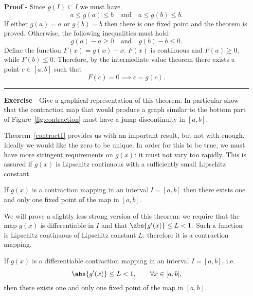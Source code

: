 \noindent
\textbf{Proof} - Since $g(I) \subseteq I$ we must have
%
\begin{equation*}
   a \le g(a) \le b \quad \text{and} \quad a \le g(b) \le b .
\end{equation*}
%
If either $g(a)=a$ or $g(b)=b$ then there is one fixed point and the
theorem is proved.   Otherwise, the following inequalities must hold:
%
\begin{equation*}
  g(a) - a \ge 0 \quad \text{and} \quad g(b) - b \le 0 .
\end{equation*}
%
Define the function $F(x) = g(x) - x$.   $F(x)$ is continuous and
$F(a) \ge 0$, while $F(b) \le 0$.   Therefore, by the intermediate
value theorem there exists a point $c \in [a,b]$ such that
%
\begin{equation*}
  F(c)=0 \implies c = g(c) .
\end{equation*}

\hfill \rule{3mm}{3mm}

\smallskip

\noindent
\textbf{Exercise} - Give a graphical representation of this theorem.
In particular show that the contraction map that would produce a graph
similar to the bottom part of Figure~\ref{fig:contraction} must have a
jump discontinuity in $[a,b]$.

\smallskip

Theorem~\ref{contract1} provides us with an important result, but not
with enough.  Ideally we would like the zero to be unique.  In order
for this to be true, we must have more stringent requirements on
$g(x)$: it must not vary too rapidly.  This is assured if $g(x)$ is
Lipschitz continuous with a sufficiently small Lipschitz constant.

\begin{theorem}
\label{contract2}
If $g(x)$ is a contraction mapping in an interval
$I=[a,b]$ then there exists one and only one fixed point of the map in
$[a,b]$.
\end{theorem}

We will prove a slightly less strong version of this theorem: we
require that the map $g(x)$ is differentiable in $I$ and that $\abs{g'(x)}
\le L < 1$.   Such a function is Lipschitz continuous of Lipschitz
constant $L$: therefore it is a contraction mapping.

\begin{theorem}
\label{contract3}
If $g(x)$ is a differentiable contraction mapping
in an interval $I=[a,b]$, i.e.
%
\begin{equation*}
  \abs{g'(x)} \le L < 1, \qquad \forall x \in [a,b] ,
\end{equation*}
%
then there exists one and only one fixed point of the map in $[a,b]$.
\end{theorem}

